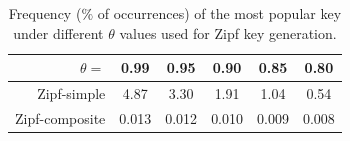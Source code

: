 \begin{table}
\begin{center}
\begin{tabular}{rccccc}
$\theta=$	& 0.99 & 0.95 & 0.90 & 0.85 & 0.80 \\ 
	\hline 
	Zipf-simple & 4.87 & 3.30 & 1.91 & 1.04 & 0.54 \\ 
	Zipf-composite & 0.013 & 0.012 & 0.010 & 0.009 & 0.008 \\ 
\end{tabular} 
\end{center}
\caption{Frequency ($\%$ of occurrences) of the most popular key under different $\theta$ values used for Zipf key generation.}
\label{table:theta}
\end{table} 


 
 

